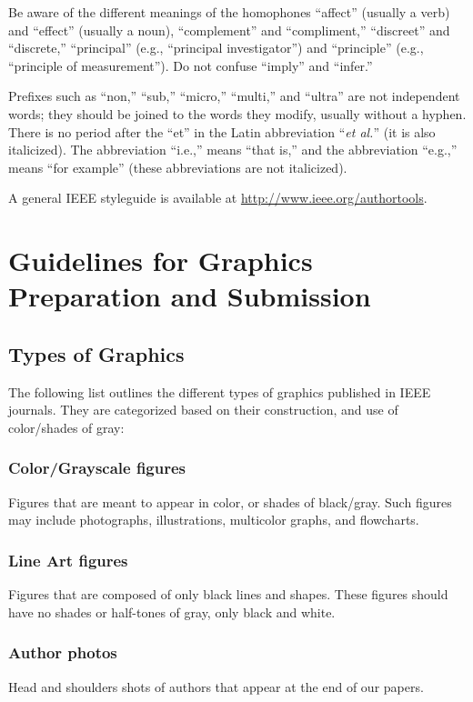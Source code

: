 \documentclass[twoside,web]{ieeecolor}
\begin{document}
Be aware of the different meanings of the homophones ``affect'' (usually a 
verb) and ``effect'' (usually a noun), ``complement'' and ``compliment,'' 
``discreet'' and ``discrete,'' ``principal'' (e.g., ``principal 
investigator'') and ``principle'' (e.g., ``principle of measurement''). Do 
not confuse ``imply'' and ``infer.'' 

Prefixes such as ``non,'' ``sub,'' ``micro,'' ``multi,'' and ``ultra'' are 
not independent words; they should be joined to the words they modify, 
usually without a hyphen. There is no period after the ``et'' in the Latin 
abbreviation ``\emph{et al.}'' (it is also italicized). The abbreviation ``i.e.,'' means 
``that is,'' and the abbreviation ``e.g.,'' means ``for example'' (these 
abbreviations are not italicized).

A general IEEE styleguide is available at \underline{http://www.ieee.org/authortools}.

\section{Guidelines for Graphics Preparation and Submission}
\label{sec:guidelines}

\subsection{Types of Graphics}
The following list outlines the different types of graphics published in 
IEEE journals. They are categorized based on their construction, and use of 
color/shades of gray:

\subsubsection{Color/Grayscale figures}
{Figures that are meant to appear in color, or shades of black/gray. Such 
figures may include photographs, illustrations, multicolor graphs, and 
flowcharts.}

\subsubsection{Line Art figures}
{Figures that are composed of only black lines and shapes. These figures 
should have no shades or half-tones of gray, only black and white.}

\subsubsection{Author photos}
{Head and shoulders shots of authors that appear at the end of our papers. }
\end{document}
